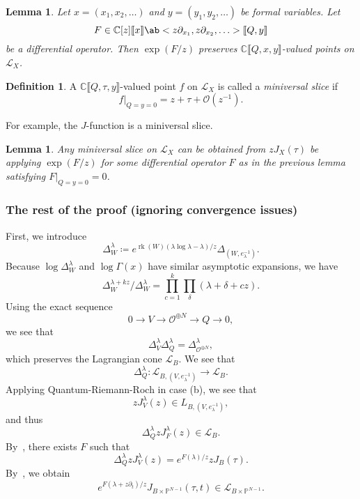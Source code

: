 \documentclass[leqno, openany]{memoir}
\newtheorem{lem}[thm]{Lemma}
\theoremstyle{definition}
\newtheorem{defn}[thm]{Definition}
\theoremstyle{remark}
\theoremstyle{plain}
\theoremstyle{definition}
\theoremstyle{remark}
\newcommand{\C}{\mathbb{C}}
\renewcommand{\P}{\mathbb{P}}
\newcommand{\mc}[1]{\mathcal{#1}}
\newcommand{\on}[1]{\operatorname{#1}}
\begin{document}
\begin{lem}\label{lem:1}
    Let $x=(x_1,x_2,\ldots)$ and $y=(y_1,y_2,\ldots)$ be formal variables. Let 
    \[ F \in \C[z] \llbracket x \rrbracket \ab<z \partial_{x_1}, z \partial_{x_2},\ldots> \llbracket Q,y \rrbracket \]
    be a differential operator. Then $\exp(F/z)$ preserves $\C \llbracket Q,x,y \rrbracket$-valued points on $\mc{L}_X$.
\end{lem}

\begin{defn}
    A $\C\llbracket Q,\tau,y \rrbracket$-valued point $f$ on $\mc{L}_X$ is called a \textit{miniversal slice} if
    \[ f |_{Q=y=0} = z + \tau + \mc{O}(z^{-1}). \]
\end{defn}

For example, the $J$-function is a miniversal slice.

\begin{lem}\label{lem:2}
    Any miniversal slice on $\mc{L}_X$ can be obtained from $z J_X(\tau)$ be applying $\exp(F/z)$ for some differential operator $F$ as in the previous lemma satisfying $F|_{Q=y=0} = 0$.
\end{lem}

\subsubsection{The rest of the proof (ignoring convergence issues)}%
\label{ssub:The rest of the proof ignoring convergence issues}

First, we introduce
\[ \Delta_W^{\lambda} \coloneqq e^{\on{rk}(W) (\lambda \log \lambda - \lambda)/z} \Delta_{(W,e_{\lambda}^{-1})}. \]
Because $\log \Delta_W^{\lambda}$ and $\log \Gamma(x)$ have similar asymptotic expansions, we have
\[ \Delta_W^{\lambda + kz} / \Delta_W^{\lambda} = \prod_{c=1}^k \prod_{\delta} (\lambda + \delta + cz). \]
Using the exact sequence
\[ 0 \to V \to \mc{O}^{\oplus N} \to Q \to 0, \]
we see that
\[ \Delta_V^{\lambda} \Delta_Q^{\lambda} = \Delta_{\mc{O}^{\oplus N}}^{\lambda}, \]
which preserves the Lagrangian cone $\mc{L}_B$. We see that
\[ \Delta_Q^{\lambda} \colon \mc{L}_{B,(V, e_{\lambda}^{-1})} \to \mc{L}_B. \]
Applying Quantum-Riemann-Roch in case (b), we see that
\[ z J_V^{\lambda}(z) \in L_{B,(V, e_{\lambda}^{-1})}, \]
and thus
\[ \Delta_Q^{\lambda} z J_F^{\lambda}(z) \in \mc{L}_B. \]
By~, there exists $F$ such that
\[ \Delta_Q^{\lambda} z J_V^{\lambda}(z) = e^{F(\lambda)/z} z J_B(\tau). \]
By~, we obtain
\[ e^{F(\lambda + z \partial_t)/z} J_{B \times \P^{N-1}}(\tau, t) \in \mc{L}_{B \times \P^{N-1}}. \]
\end{document}
